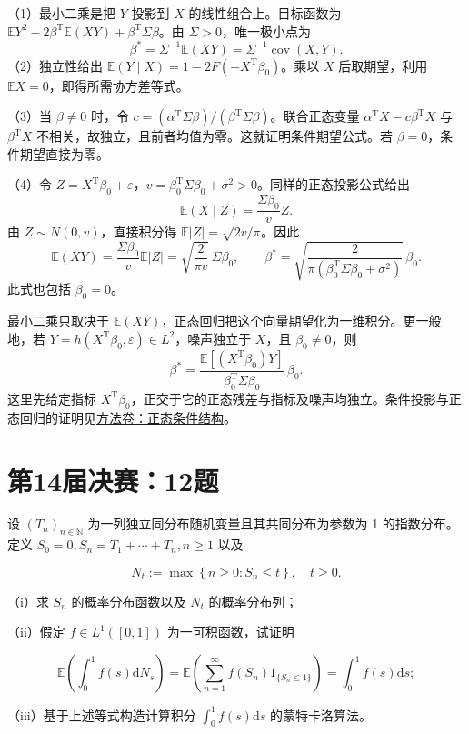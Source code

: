 \begin{solve}

（1）最小二乘是把 $Y$ 投影到 $X$ 的线性组合上。目标函数为 $\mathbb EY^2-2\beta^{\mathrm T}\mathbb E(XY)+\beta^{\mathrm T}\Sigma\beta$。由 $\Sigma>0$，唯一极小点为
\[
\beta^*=\Sigma^{-1}\mathbb E(XY)=\Sigma^{-1}\operatorname{cov}(X,Y).
\]
（2）独立性给出 $\mathbb E(Y\mid X)=1-2F(-X^{\mathrm T}\beta_0)$。乘以 $X$ 后取期望，利用 $\mathbb EX=0$，即得所需协方差等式。

（3）当 $\beta\ne0$ 时，令 $c=(\alpha^{\mathrm T}\Sigma\beta)/(\beta^{\mathrm T}\Sigma\beta)$。联合正态变量 $\alpha^{\mathrm T}X-c\beta^{\mathrm T}X$ 与 $\beta^{\mathrm T}X$ 不相关，故独立，且前者均值为零。这就证明条件期望公式。若 $\beta=0$，条件期望直接为零。

（4）令 $Z=X^{\mathrm T}\beta_0+\varepsilon$，$v=\beta_0^{\mathrm T}\Sigma\beta_0+\sigma^2>0$。同样的正态投影公式给出
\[
\mathbb E(X\mid Z)=\frac{\Sigma\beta_0}{v}Z.
\]
由 $Z\sim N(0,v)$，直接积分得 $\mathbb E|Z|=\sqrt{2v/\pi}$。因此
\[
\mathbb E(XY)=\frac{\Sigma\beta_0}{v}\mathbb E|Z|
=\sqrt{\frac2{\pi v}}\,\Sigma\beta_0,
\qquad
\boxed{\beta^*=\sqrt{\frac2{\pi(\beta_0^{\mathrm T}\Sigma\beta_0+\sigma^2)}}\,\beta_0}.
\]
此式也包括 $\beta_0=0$。

\end{solve}

\begin{remark}[方法与条件]

最小二乘只取决于 $\mathbb E(XY)$，正态回归把这个向量期望化为一维积分。更一般地，若 $Y=h(X^{\mathrm T}\beta_0,\varepsilon)\in L^2$，噪声独立于 $X$，且 $\beta_0\ne0$，则
\[
\beta^*=\frac{\mathbb E[(X^{\mathrm T}\beta_0)Y]}{\beta_0^{\mathrm T}\Sigma\beta_0}\,\beta_0.
\]
这里先给定指标 $X^{\mathrm T}\beta_0$，正交于它的正态残差与指标及噪声均独立。条件投影与正态回归的证明见\hyperref[app:probability-gaussian]{方法卷：正态条件结构}。

\end{remark}

\section{第14届决赛：12题}\label{pr:fin14-high:12}

\begin{example}[公开题解转录]\label{q:fin14-high:12}

设 $\left(T_n\right)_{n \in \mathbb{N}}$ 为一列独立同分布随机变量且其共同分布为参数为 1 的指数分布。定义 $S_0 = 0, S_n = T_1 + \cdots + T_n, n \geq 1$ 以及

\[
N_t := \max \left\{n \geq 0 : S_n \leq t\right\},\quad t \geq 0.
\]

（i）求 $S_n$ 的概率分布函数以及 $N_t$ 的概率分布列；

（ii）假定 $f \in L^1([0,1])$ 为一可积函数，试证明

\[
\mathbb{E}\left(\int_0^1 f(s) \mathrm{d}N_s\right) = \mathbb{E}\left(\sum_{n=1}^{\infty} f\left(S_n\right)1_{\{S_n \leq 1\}}\right) = \int_0^1 f(s) \mathrm{d}s;
\]

（iii）基于上述等式构造计算积分 $\int_0^1 f(s) \mathrm{d}s$ 的蒙特卡洛算法。

\end{example}


